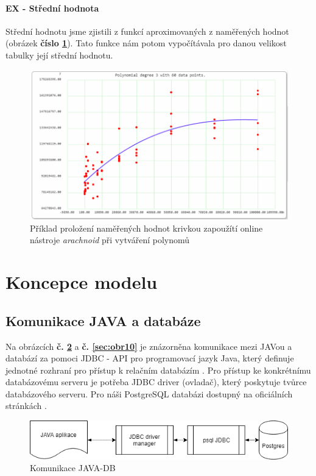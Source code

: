 \documentclass[a4paper, 11pt]{article}
\begin{document}
\paragraph{EX - Střední hodnota} Střední hodnotu jsme zjistili z funkcí  aproximovaných z naměřených hodnot (obrázek \textbf{číslo \ref{sec:obr9}}). Tato funkce nám potom vypočítávala pro danou velikost tabulky její střední hodnotu.

\begin{figure}[H]
\centering
\includegraphics[width=150mm, frame]{images/VYPOCET-KRIVEK.png}
\caption{Příklad proložení naměřených hodnot krivkou zapoužítí online nástroje \textit{arachnoid} \cite{polysolv} při vytváření polynomů}
\label{sec:obr9}
\end{figure}

\section{Koncepce modelu}


\subsection{Komunikace JAVA a databáze}
Na obrázcích \textbf{č. \ref{sec:obr8}} a \textbf{č. \ref{sec:obr10}} je znázorněna komunikace mezi JAVou a databází za pomoci JDBC - API pro programovací jazyk Java, který definuje jednotné rozhraní pro přístup k relačním databázím \cite{connectivity}. Pro přístup ke konkrétnímu databázovému serveru je potřeba JDBC driver (ovladač), který poskytuje tvůrce databázového serveru. Pro náši PostgreSQL databázi dostupný na oficiálních stránkách \cite{jdbc}.

\begin{figure}[H]
\centering
\includegraphics[width=150mm]{images/JAVA-DB-komunikace.png}
\caption{Komunikace JAVA-DB}
\label{sec:obr8}
\end{figure}
\end{document}
